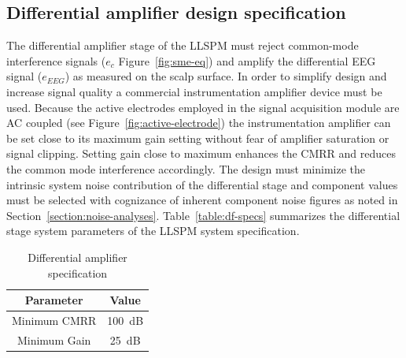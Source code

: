 \subsection{Differential amplifier design specification}
\label{section:dif-spec}
The differential amplifier stage of the LLSPM must reject common-mode
interference signals ($e_c$ Figure~\vref{fig:sme-eq}) and amplify the
differential EEG signal ($e_{EEG}$) as measured on the scalp
surface. In order to simplify design and increase signal quality a
commercial instrumentation amplifier device must be used. Because the
active electrodes employed in the signal acquisition module are AC
coupled (see Figure~\vref{fig:active-electrode}) the instrumentation
amplifier can be set close to its maximum gain setting without fear of
amplifier saturation or signal clipping. Setting gain close to maximum
enhances the CMRR and reduces the common mode interference
accordingly. The design must minimize the intrinsic system noise
contribution of the differential stage and component values must be
selected with cognizance of inherent component noise figures as noted
in Section~\vref{section:noise-analyses}. Table~\vref{table:df-specs}
summarizes the differential stage system parameters of the LLSPM
system specification.

\begin{table}
\begin{center}	
	\begin{tabular}[hpb]{|c|c|} \hline
	Parameter & Value \\ \hline
	Minimum CMRR & 100~dB \\
	Minimum Gain & 25~dB \\ 
	\hline
	\end{tabular}
	\caption{Differential amplifier specification}
	\label{table:df-specs}
\end{center}	
\end{table}



